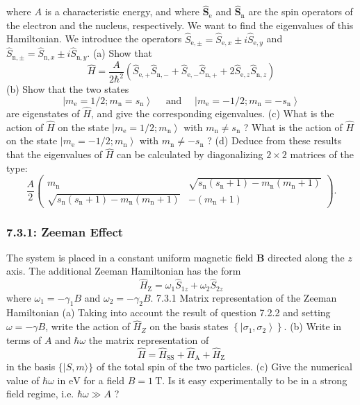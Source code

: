\documentclass[11pt]{article}
\begin{document}
where \(A\) is a characteristic energy, and where \(\hat{\boldsymbol{S}}_{\mathrm{e}}\) and \(\hat{\boldsymbol{S}}_{\mathrm{n}}\) are the spin operators of the electron and the nucleus, respectively. We want to find the eigenvalues of this Hamiltonian.
We introduce the operators \(\hat{S}_{\mathrm{e}, \pm}=\hat{S}_{\mathrm{e}, x} \pm i \hat{S}_{\mathrm{e}, y}\) and \(\hat{S}_{\mathrm{n}, \pm}=\hat{S}_{\mathrm{n}, x} \pm i \hat{S}_{\mathrm{n}, y}\).
(a) Show that
$$
\hat{H}=\frac{A}{2 \hbar^2}\left(\hat{S}_{\mathrm{e},+} \hat{S}_{\mathrm{n},-}+\hat{S}_{\mathrm{e},-} \hat{S}_{\mathrm{n},+}+2 \hat{S}_{\mathrm{e}, z} \hat{S}_{\mathrm{n}, z}\right)
$$
(b) Show that the two states
$$
\left|m_{\mathrm{e}}=1 / 2 ; m_{\mathrm{n}}=s_{\mathrm{n}}\right\rangle \quad \text { and } \quad\left|m_{\mathrm{e}}=-1 / 2 ; m_{\mathrm{n}}=-s_{\mathrm{n}}\right\rangle
$$
are eigenstates of \(\hat{H}\), and give the corresponding eigenvalues.
(c) What is the action of \(\hat{H}\) on the state \(\left|m_{\mathrm{e}}=1 / 2 ; m_{\mathrm{n}}\right\rangle\) with \(m_{\mathrm{n}} \neq s_{\mathrm{n}}\) ?
What is the action of \(\hat{H}\) on the state \(\left|m_{\mathrm{e}}=-1 / 2 ; m_{\mathrm{n}}\right\rangle\) with \(m_{\mathrm{n}} \neq-s_{\mathrm{n}}\) ?
(d) Deduce from these results that the eigenvalues of \(\hat{H}\) can be calculated by diagonalizing \(2 \times 2\) matrices of the type:
$$
\frac{A}{2}\left(\begin{array}{lr}
m_{\mathrm{n}} & \sqrt{s_{\mathrm{n}}\left(s_{\mathrm{n}}+1\right)-m_{\mathrm{n}}\left(m_{\mathrm{n}}+1\right)} \\
\sqrt{s_{\mathrm{n}}\left(s_{\mathrm{n}}+1\right)-m_{\mathrm{n}}\left(m_{\mathrm{n}}+1\right)} & -\left(m_{\mathrm{n}}+1\right)
\end{array}\right) .
$$
\subsubsection{7.3.1: Zeeman Effect}
\label{sec:org1d3d6fb}
The system is placed in a constant uniform magnetic field \(\boldsymbol{B}\) directed along the \(z\) axis. The additional Zeeman Hamiltonian has the form
$$
\hat{H}_{\mathrm{Z}}=\omega_1 \hat{S}_{1 z}+\omega_2 \hat{S}_{2 z}
$$
where \(\omega_1=-\gamma_1 B\) and \(\omega_2=-\gamma_2 B\).
7.3.1 Matrix representation of the Zeeman Hamiltonian
(a) Taking into account the result of question 7.2.2 and setting \(\omega=-\gamma B\), write the action of \(\hat{H}_Z\) on the basis states \(\left\{\left|\sigma_1, \sigma_2\right\rangle\right\}\).
(b) Write in terms of \(A\) and \(\hbar \omega\) the matrix representation of
$$
\hat{H}=\hat{H}_{\mathrm{SS}}+\hat{H}_{\mathrm{A}}+\hat{H}_{\mathrm{Z}}
$$
in the basis \(\{|S, m\rangle\}\) of the total spin of the two particles.
(c) Give the numerical value of \(\hbar \omega\) in \(\mathrm{eV}\) for a field \(B=1 \mathrm{~T}\). Is it easy experimentally to be in a strong field regime, i.e. \(\hbar \omega \gg A\) ?
\end{document}
